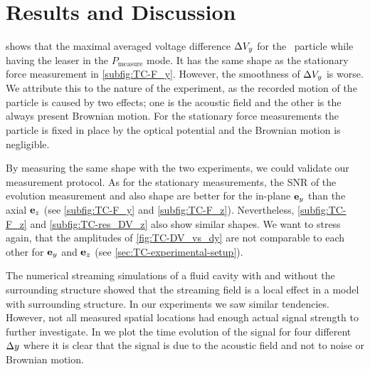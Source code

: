 \section{Results and Discussion\label{sec:TC-results}}

 shows that the maximal averaged voltage difference 
$\Delta V_{y}$ for the \Dtwo~particle while having the leaser in the 
$P_{\text{measure}}$ mode. It has the same shape as the stationary force 
measurement in \cref{subfig:TC-F_y}.  However, the smoothness of $\Delta V_{y}$ is 
worse. We attribute this to the nature of the experiment, as the recorded 
motion of the particle is caused by two effects; one is the acoustic field and 
the other is the always present Brownian motion.  For the stationary force 
measurements the particle is fixed in place by the optical potential and the 
Brownian motion is negligible.

By measuring the same shape with the two experiments, we could validate our 
measurement protocol. As for the stationary measurements, the SNR of the 
evolution measurement and also shape are better for the in-plane $\vb{e}_{y}$ than the 
axial $\vb{e}_{z}$ (see \cref{subfig:TC-F_y} and \cref{subfig:TC-F_z}). Nevertheless, 
\cref{subfig:TC-F_z} and \cref{subfig:TC-res_DV_z} also show similar shapes. We 
want to stress again, that the amplitudes of \cref{fig:TC-DV_vs_dy} are not 
comparable to each other for $\vb{e}_{y}$ and $\vb{e}_{z}$ (see 
\cref{sec:TC-experimental-setup}).

The numerical streaming simulations of a fluid cavity with and without the
surrounding structure showed that the streaming field is a local effect in a
model with surrounding structure. In our experiments we saw similar tendencies.  
However, not all measured spatial locations had enough actual signal strength 
to further investigate. In  we plot the time evolution 
of the signal for four different $\Delta y$ where it is clear that the signal is due 
to the acoustic field and not to noise or Brownian motion.

